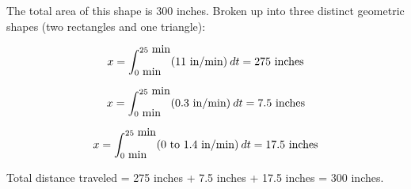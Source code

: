 The total area of this shape is 300 inches.  Broken up into three distinct geometric shapes (two rectangles and one triangle):

$$x = \int_{0 \hbox{ min}}^{25 \hbox{ min}} (11 \hbox{ in/min}) \> dt = 275 \hbox{ inches}$$

$$x = \int_{0 \hbox{ min}}^{25 \hbox{ min}} (0.3 \hbox{ in/min}) \> dt = 7.5 \hbox{ inches}$$

$$x = \int_{0 \hbox{ min}}^{25 \hbox{ min}} (0 \hbox{ to } 1.4 \hbox{ in/min}) \> dt = 17.5 \hbox{ inches}$$

\vskip 10pt

Total distance traveled = 275 inches + 7.5 inches + 17.5 inches = 300 inches.











